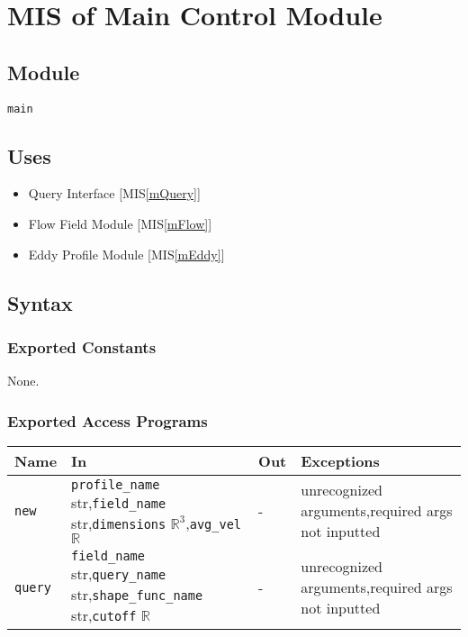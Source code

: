 \documentclass[12pt, titlepage]{article}
\begin{document}
\newpage
\section{MIS of Main Control Module} \label{mMain} 

\subsection{Module}
\texttt{main}

\subsection{Uses}
\begin{itemize}
\item Query Interface [MIS\ref{mQuery}]
\item Flow Field Module [MIS\ref{mFlow}]
\item Eddy Profile Module [MIS\ref{mEddy}]
\end{itemize}

\subsection{Syntax}

\subsubsection{Exported Constants}
None.

\subsubsection{Exported Access Programs}

\begin{center}
\begin{tabular}{p{2cm} p{4cm} p{2.5cm} p{5cm}}
\hline
\textbf{Name} & \textbf{In} & \textbf{Out} & \textbf{Exceptions} \\
\hline
\texttt{new}  & \texttt{profile\_name} str,\newline\texttt{field\_name} str,\newline\texttt{dimensions} $\mathbb{R}^3$,\newline\texttt{avg\_vel} $\mathbb{R}$ & - & unrecognized arguments,\newline required args not inputted\\
\texttt{query}  & \texttt{field\_name} str,\newline\texttt{query\_name} str,\newline\texttt{shape\_func\_name} str,\newline\texttt{cutoff} $\mathbb{R}$ & - & unrecognized arguments,\newline required args not inputted\\
\hline
\end{tabular}
\end{center}
\end{document}
